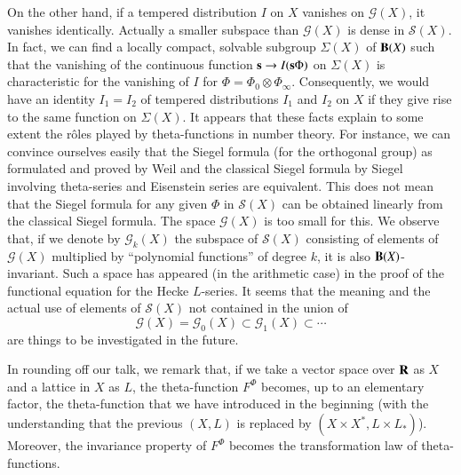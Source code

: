 On the other hand, if a tempered distribution $I$ on $X$ vanishes on $\mathscr{G}(X)$, it vanishes identically. Actually a smaller subspace than $\mathscr{G}(X)$ is dense in $\mathscr{S}(X)$. In fact, we can find a locally compact, solvable subgroup $\Sigma(X)$ of $\mathbf{B}(X)$ such that the vanishing of the continuous function $\mathbf{s}\to I(\mathbf{s}\Phi)$ on $\Sigma(X)$ is characteristic for the vanishing of $I$ for $\Phi=\Phi_{0}\otimes \Phi_{\infty}$. Consequently, we would have an identity $I_{1}=I_{2}$ of tempered distributions $I_{1}$ and $I_{2}$ on $X$ if they give rise to the same function on $\Sigma(X)$. It appears that these facts explain to some extent the r\^oles played by theta-functions in number theory. For instance, we can convince ourselves easily that the Siegel formula (for the orthogonal group) as formulated and proved by Weil \cite{art12-key26} and the classical Siegel formula by Siegel \cite{art12-key22} involving theta-series and Eisenstein series are equivalent. This does not mean that the Siegel formula for any given $\Phi$ in $\mathscr{S}(X)$ can be obtained linearly from the classical Siegel formula. The space $\mathscr{G}(X)$ is too small for this. We observe that, if we denote by $\mathscr{G}_{k}(X)$ the subspace of $\mathscr{S}(X)$ consisting of elements of $\mathscr{G}(X)$ multiplied by ``polynomial functions'' of degree $k$, it is also $\mathbf{B}(X)$-invariant. Such a space has appeared (in the arithmetic case) in the proof of the functional equation for the Hecke $L$-series. It seems that the meaning and the actual use of elements of $\mathscr{S}(X)$ not contained in the union of
$$
\mathscr{G}(X)=\mathscr{G}_{0}(X)\subset \mathscr{G}_{1}(X)\subset \cdots
$$ 
are things to be investigated in the future.

In rounding off our talk, we remark that, if we take a vector space over $\mathbf{R}$ as $X$ and a lattice in $X$ as $L$, the theta-function $F^{\Phi}$ becomes, up to an elementary factor, the theta-function that we have introduced in the beginning (with the understanding that the previous $(X,L)$ is replaced by $(X\times X^{*}, L\times L_{*})$). Moreover, the invariance property of $F^{\Phi}$ becomes the transformation law of theta-functions.

